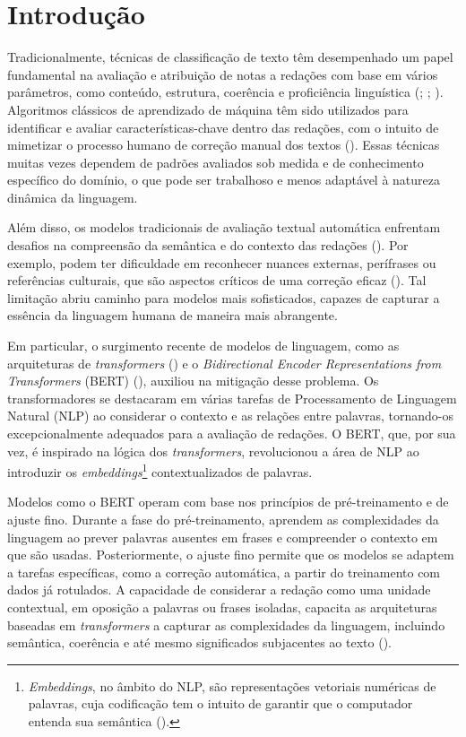 \chapter{Introdução}

Tradicionalmente, técnicas de classificação de texto têm desempenhado um papel fundamental na avaliação e atribuição de notas a redações com base em vários parâmetros, como conteúdo, estrutura, coerência e proficiência linguística (\cite{rudner-etal-2006-evaluation}; \cite{persing-etal-2010-modeling}; \cite{somasundaran-etal-2014-lexical}). Algoritmos clássicos de aprendizado de máquina têm sido utilizados para identificar e avaliar características-chave dentro das redações, com o intuito de mimetizar o processo humano de correção manual dos textos (\cite{larkey-1998-automatic}). Essas técnicas muitas vezes dependem de padrões avaliados sob medida e de conhecimento específico do domínio, o que pode ser trabalhoso e menos adaptável à natureza dinâmica da linguagem.

Além disso, os modelos tradicionais de avaliação textual automática enfrentam desafios na compreensão da semântica e do contexto das redações (\cite{lim-etal-2021-comprehensive}). Por exemplo, podem ter dificuldade em reconhecer nuances externas, perífrases ou referências culturais, que são aspectos críticos de uma correção eficaz (\cite{enem-compIII}). Tal limitação abriu caminho para modelos mais sofisticados, capazes de capturar a essência da linguagem humana de maneira mais abrangente.

Em particular, o surgimento recente de modelos de linguagem, como as arquiteturas de \textit{transformers} (\cite{attention2017}) e o \textit{Bidirectional Encoder Representations from Transformers} (BERT) (\cite{bert2018}), auxiliou na mitigação desse problema. Os transformadores se destacaram em várias tarefas de Processamento de Linguagem Natural (NLP) ao considerar o contexto e as relações entre palavras, tornando-os excepcionalmente adequados para a avaliação de redações. O BERT, que, por sua vez, é inspirado na lógica dos \textit{transformers}, revolucionou a área de NLP ao introduzir os \textit{embeddings}\footnote{\textit{Embeddings}, no âmbito do NLP, são representações vetoriais numéricas de palavras, cuja codificação tem o intuito de garantir que o computador entenda sua semântica (\cite{zhang2023dive}).} contextualizados de palavras.

Modelos como o BERT operam com base nos princípios de pré-treinamento e de ajuste fino. Durante a fase do pré-treinamento, aprendem as complexidades da linguagem ao prever palavras ausentes em frases e compreender o contexto em que são usadas. Posteriormente, o ajuste fino permite que os modelos se adaptem a tarefas específicas, como a correção automática, a partir do treinamento com dados já rotulados. A capacidade de considerar a redação como uma unidade contextual, em oposição a palavras ou frases isoladas, capacita as arquiteturas baseadas em \textit{transformers} a capturar as complexidades da linguagem, incluindo semântica, coerência e até mesmo significados subjacentes ao texto (\cite{yang-etal-2020-enhancing}).

